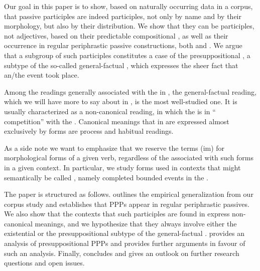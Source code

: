 \documentclass[output=paper,modfonts,newtxmath,hidelinks
\ChapterDOI{10.5281/zenodo.2545513}
]{langscibook}
\begin{document}
Our goal in this paper is to show, based on naturally occurring data in a corpus, that   passive participles are indeed participles, not only by name and by their morphology, but also by their distribution. We show that they can be participles, not adjectives, based on their predictable compositional , as well as their occurrence in regular periphrastic passive constructions, both  and . We argue that a subgroup of such participles constitutes a case of the presuppositional  \citep[in the sense of][]{gronndiss}, a subtype of the so-called general-factual , which expresses the sheer fact that an/the event took place. 

Among the readings generally associated with the  in , the general-factual reading, which we will have more to say about in , is the most well-studied one. It is usually characterized as a non-canonical reading, in which the  is in `` competition'' with the  \citep[a term that goes back to at least][]{mathesius38}. Canonical  meanings that in  are expressed almost exclusively by  forms are process and habitual readings. 

\largerpage[2]
As a side note we want to emphasize that we reserve the terms (im) for morphological forms of a given verb, regardless of the  associated with such forms in a given context. In particular, we study  forms used in contexts that might semantically be called , namely completed bounded events in the .

The paper is structured as follows.  outlines the empirical generalization from our corpus study and establishes that  PPPs appear in regular periphrastic passives. We also show that the  contexts that such participles are found in express non-canonical  meanings, and we hypothesize that they always involve either the existential or the presuppositional subtype of the general-factual .  provides an analysis of presuppositional  PPPs and provides further arguments in favour of such an analysis. Finally,  concludes and gives an outlook on further research questions and open issues. 
\end{document}
